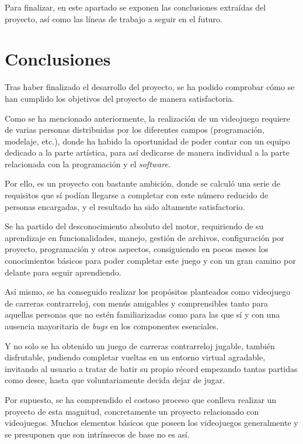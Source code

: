 
Para finalizar, en este apartado se exponen las conclusiones extraídas del proyecto, así como las líneas de trabajo a seguir en el futuro.

\section{Conclusiones}

Tras haber finalizado el desarrollo del proyecto, se ha podido comprobar cómo se han cumplido los objetivos del proyecto de manera satisfactoria. 

Como se ha mencionado anteriormente, la realización de un videojuego requiere de varias personas distribuidas por los diferentes campos (programación, modelaje, etc.), donde ha habido la oportunidad de poder contar con un equipo dedicado a la parte artística, para así dedicarse de manera individual a la parte relacionada con la programación y el \textit{software}. 

Por ello, es un proyecto con bastante ambición, donde se calculó una serie de requisitos que sí podían llegarse a completar con este número reducido de personas encargadas, y el resultado ha sido altamente satisfactorio.

Se ha partido del desconocimiento absoluto del motor, requiriendo de su aprendizaje en funcionalidades, manejo, gestión de archivos, configuración por proyecto, programación y otros aspectos, consiguiendo en pocos meses los conocimientos básicos para poder completar este juego y con un gran camino por delante para seguir aprendiendo.

Así mismo, se ha conseguido realizar los propósitos planteados como videojuego de carreras contrarreloj, con menús amigables y comprensibles tanto para aquellas personas que no estén familiarizadas como para las que sí y con una ausencia mayoritaria de \textit{bugs} en los componentes esenciales.

Y no solo se ha obtenido un juego de carreras contrarreloj jugable, también disfrutable, pudiendo completar vueltas en un entorno virtual agradable, invitando al usuario a tratar de batir su propio récord empezando tantas partidas como desee, hasta que voluntariamente decida dejar de jugar.

Por supuesto, se ha comprendido el costoso proceso que conlleva realizar un proyecto de esta magnitud, concretamente un proyecto relacionado con videojuegos. Muchos elementos básicos que poseen los videojuegos generalmente y se presuponen que son intrínsecos de base no es así.

